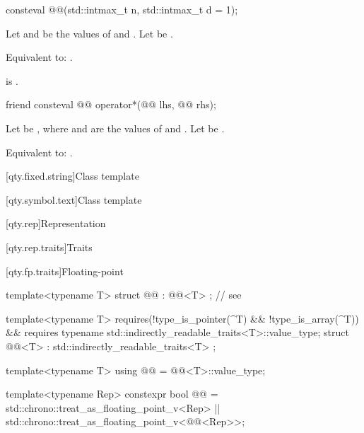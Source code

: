 \begin{itemdecl}
consteval @@(std::intmax_t n, std::intmax_t d = 1);
\end{itemdecl}

\begin{itemdescr}
\pnum
Let  and  be the values of  and .
Let  be .

\pnum
\effects
Equivalent to: .

\pnum
\ensures
{} is .
\end{itemdescr}

\begin{itemdecl}
friend consteval @@ operator*(@@ lhs, @@ rhs);
\end{itemdecl}

\begin{itemdescr}
\pnum
Let  be ,
where  and  are the values of  and .
Let  be .

\pnum
\effects
Equivalent to: .
\end{itemdescr}

[qty.fixed.string]{Class template }

[qty.symbol.text]{Class template }

[qty.rep]{Representation}

[qty.rep.traits]{Traits}

[qty.fp.traits]{Floating-point}

\begin{itemdecl}
template<typename T>
struct @@ : @@<T> {}; // see 

template<typename T>
  requires(!type_is_pointer(^T) && !type_is_array(^T)) &&
          requires { typename std::indirectly_readable_traits<T>::value_type; }
struct @@<T> : std::indirectly_readable_traits<T> {};

template<typename T>
using @@ = @@<T>::value_type;

template<typename Rep>
constexpr bool @@ =
  std::chrono::treat_as_floating_point_v<Rep> ||
  std::chrono::treat_as_floating_point_v<@@<Rep>>;
\end{itemdecl}

